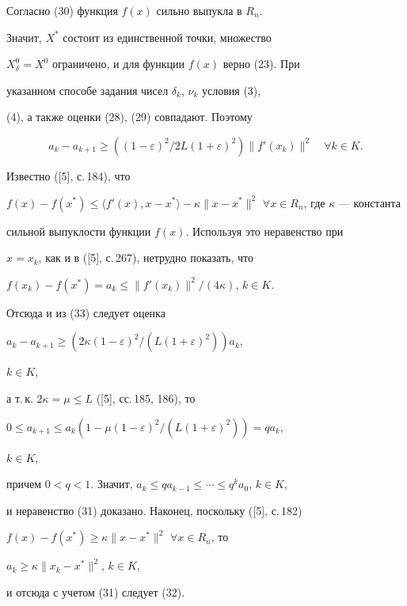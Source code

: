 \begin{pf} Согласно (30) функция $f(x)$ сильно выпукла в $R_n$.


Значит, $X^{*}$ состоит из единственной точки, множество


$X^0_{\delta }=X^0$ ограничено, и для функции $f(x)$ верно (23). При 


указанном способе задания чисел $\delta_k$, $\nu_k$ условия (3), 


(4), а также оценки (28), (29) совпадают. Поэтому


\begin{equation}


a_k-a_{k+1}\geq ((1-\varepsilon )^2/2L(1+\varepsilon )^2)


\| {{f}'(x_k) } \|^2\quad \forall k\in K.


\end{equation}


Известно ([5], с.\,184), что


$f(x)-f(x^*)\leq \langle f'(x),x-x^*\rangle -


\kappa \|x-x^*\|^2$ $\forall x\in R_n$, где $\kappa $ --- константа


сильной выпуклости функции $f(x)$. Используя это неравенство при


$x=x_k$, как и в ([5], с.\,267), нетрудно показать, что 


$f(x_k)-f(x^*)=a_k\leq \|f'(x_k)\|^2/(4\kappa)$, $k\in K$.


Отсюда и из (33) следует оценка


$a_k-a_{k+1}\geq (2\kappa (1-\varepsilon )^2/(L(1+\varepsilon )^2))a_k$,


$k\in K$,


а т.\,к.{} $2\kappa =\mu \leq L$ ([5], сс.\,185, 186), то 


$0\le a_{k+1}\le a_k(1-\mu (1-\varepsilon )^2/(L(1+\varepsilon )^2))=qa_k$,


$k\in K$,


причем $0<q<1$. Значит, $a_k\le qa_{k-1}\le\dotsb\le q^ka_0$, $k\in K$,


и неравенство (31) доказано. Наконец, поскольку ([5], с.\,182)


$f(x)-f(x^*)\geq \kappa \|x-x^*\|^2$ $\forall x\in R_n$, то


$a_k\geq \kappa \|x_k-x^*\|^2$, $k\in K$,


и отсюда с учетом (31) следует (32).


\end{pf}





